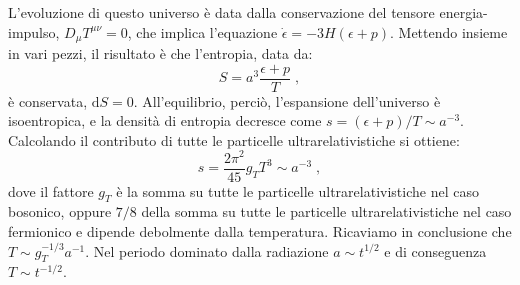 \documentclass[12pt,a4paper]{report}
\theoremstyle{definition}
\newcommand{\diff}[1][]{\mathrm{d}#1}
\begin{document}
L'evoluzione di questo universo è data dalla conservazione del tensore energia-impulso, $D_{\mu}T^{\mu\nu}=0$, che implica l'equazione $\dot{\epsilon}=-3H(\epsilon+p)$. Mettendo insieme in vari pezzi, il risultato è che l'entropia, data da:
\begin{equation}
S=a^3\frac{\epsilon+p}{T}\;,
\end{equation}
è conservata, $\diff{S}=0$. All'equilibrio, perciò, l'espansione dell'universo è isoentropica, e la densità di entropia decresce come $s=(\epsilon+p)/T\sim a^{-3}$. Calcolando il contributo di tutte le particelle ultrarelativistiche si ottiene:
\begin{equation}
s=\frac{2\pi^2}{45}g_T T^3\sim a^{-3}\;,
\end{equation}
dove il fattore $g_T$ è la somma su tutte le particelle ultrarelativistiche nel caso bosonico, oppure $7/8$ della somma su tutte le particelle ultrarelativistiche nel caso fermionico e dipende debolmente dalla temperatura. Ricaviamo in conclusione che $T\sim g_T^{-1/3}a^{-1}$. Nel periodo dominato dalla radiazione $a\sim t^{1/2}$ e di conseguenza $T\sim t^{-1/2}$.
\end{document}

